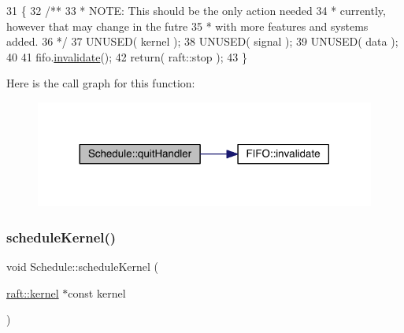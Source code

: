 \begin{DoxyCode}
31 \{\textcolor{comment}{}
32 \textcolor{comment}{   /**}
33 \textcolor{comment}{    * NOTE: This should be the only action needed}
34 \textcolor{comment}{    * currently, however that may change in the futre}
35 \textcolor{comment}{    * with more features and systems added.}
36 \textcolor{comment}{    */}
37    UNUSED( kernel );
38    UNUSED( signal );
39    UNUSED( data   );
40 
41    fifo.\hyperlink{class_f_i_f_o_af65e8231c0d1a7cdf250f2ce57f3723f}{invalidate}();
42    \textcolor{keywordflow}{return}( raft::stop );
43 \}
\end{DoxyCode}
Here is the call graph for this function\+:
\nopagebreak
\begin{figure}[H]
\begin{center}
\leavevmode
\includegraphics[width=317pt]{class_schedule_a5167d622689a34ea5f3a065304295521_cgraph}
\end{center}
\end{figure}
\hypertarget{class_schedule_a6a722f6e76c8b8dc67874d9974b6d641}{}\label{class_schedule_a6a722f6e76c8b8dc67874d9974b6d641} 
\subsubsection{\texorpdfstring{schedule\+Kernel()}{scheduleKernel()}}
{\footnotesize\ttfamily void Schedule\+::schedule\+Kernel (\begin{DoxyParamCaption}\item[{\hyperlink{classraft_1_1kernel}{raft\+::kernel} $\ast$const}]{kernel }\end{DoxyParamCaption})\hspace{0.3cm}{\ttfamily [virtual]}}

